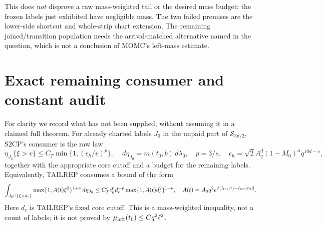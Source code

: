 \documentclass[11pt]{article}
\numberwithin{equation}{section}
\theoremstyle{remark}\newtheorem{remark}[proposition]{Remark}
\newcommand{\dd}{\,d}
\newcommand{\Sm}{\mathcal S}
\begin{document}
This does \emph{not} disprove a raw mass-weighted tail or the desired
mass budget: the frozen labels just exhibited have negligible mass.
The two failed premises are the lower-side shortcut and whole-strip
chart extension. The remaining joined/transition population needs the
arrival-matched alternative named in the question, which is not a
conclusion of MOMC's left-mass estimate.

\section{Exact remaining consumer and constant audit}
For clarity we record what has not been supplied, without assuming it
in a claimed full theorem. For already charted labels $J_0$ in the
unpaid part of $\Sm_{3\pi/2}$, S2CP's consumer is the raw law
\begin{equation}
 \eta_{J_0}\{\xi>v\}\le C_T\min\{1,(\epsilon_h/v)^p\},
 \quad \dd\eta_{J_0}=m(t_0,b)\dd\lambda_0,\quad
 p=3/s,\quad
 \epsilon_h=\sqrt2 A_q^d(1-M_0)^\alpha q^{10d-s},
 \label{an03q3sbv1:missingtail}
\end{equation}
together with the appropriate core cutoff and a budget for the
remaining labels. Equivalently, TAILREP consumes a bound of the form
\begin{equation}
 \int_{J_0\cap\{\xi>d_c\}}
       \max\{1,A(t)\xi^2\}^{1+\nu}\dd\eta_{J_0}
 \le C_T'\epsilon_h^p d_c^{-p}
       \max\{1,A(t)d_c^2\}^{1+\nu},\quad
 A(t)=A_0q^2e^{\beta[I_{\rm tot}(t)-I_{\rm tot}(t_0)]}.
 \label{an03q3sbv1:missingmoment}
\end{equation}
Here $d_c$ is TAILREP's fixed core cutoff. This is a mass-weighted
inequality, not a count of labels; it is not proved by
$\mu_{\rm left}(t_0)\le Cq^2\ell^2$.
\end{document}
